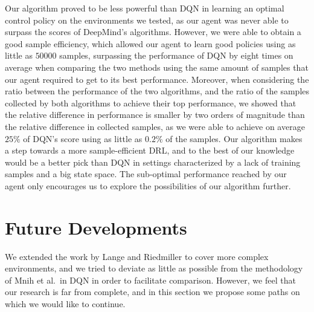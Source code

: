Our algorithm proved to be less powerful than DQN in learning an optimal control
policy on the environments we tested, as our agent was never able to surpass the
scores of DeepMind's algorithms.
However, we were able to obtain a good sample efficiency, which allowed our 
agent to learn good policies using as little as $50000$ samples, surpassing the 
performance of DQN by eight times on average when comparing the two methods 
using the same amount of samples that our agent required to get to its best 
performance.
Moreover, when considering the ratio between the performance of the two 
algorithms, and the ratio of the samples collected by both algorithms to 
achieve their top performance, we showed that the relative difference in 
performance is smaller by two orders of magnitude than the relative difference 
in collected samples, as we were able to achieve on average $25\%$ of DQN's 
score using as little as $0.2\%$ of the samples. 
Our algorithm makes a step towards a more sample-efficient DRL, and to the
best of our knowledge would be a better pick than DQN in settings characterized 
by a lack of training samples and a big state space. The sub-optimal performance
reached by our agent only encourages us to explore the possibilities of our
algorithm further.

\section{Future Developments}
We extended the work by Lange and Riedmiller \cite{lange2010deep} to cover 
more complex environments, and we tried to deviate as little as possible from 
the methodology of Mnih et al.\ in DQN in order to facilitate comparison. 
However, we feel that our research is far from complete, and in this section we 
propose some paths on which we would like to continue. 

